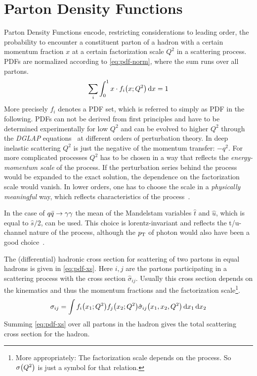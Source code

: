 \section{Parton Density Functions}%
\label{sec:pdf_basics}

Parton Density Functions encode, restricting considerations to leading
order, the probability to encounter a constituent parton of a hadron
with a certain momentum fraction \(x\) at a certain factorization
scale \(Q^2\) in a scattering process. PDFs are normalized according
to \cref{eq:pdf-norm}, where the sum runs over all partons.
%
\begin{equation}
  \label{eq:pdf-norm}
  \sum_i\int_0^1x\cdot f_i\qty(x;Q^2) \dd{x} = 1
\end{equation}
%
More precisely \({f_i}\) denotes a PDF set, which is referred to
simply as PDF in the following.  PDFs can not be derived from first
principles and have to be determined experimentally for low \(Q^2\)
and can be evolved to higher \(Q^2\) through the \emph{DGLAP}
equations~\cite{altarelli:1977af} at different orders of perturbation
theory.  In deep inelastic scattering \(Q^2\) is just the negative of
the momentum transfer: \(-q^2\). For more complicated processes
\(Q^2\) has to be chosen in a way that reflects the
\emph{energy-momentum scale} of the process. If the perturbation
series behind the process would be expanded to the exact solution, the
dependence on the factorization scale would vanish. In lower orders,
one has to choose the scale in a \emph{physically meaningful} way,
which reflects characteristics of the process~\cite{altarelli:1977af}.

In the case of \(q\bar{q}\rightarrow\gamma\gamma\) the mean of the Mandelstam variables
\(\hat{t}\) and \(\hat{u}\), which is equal to \(\hat{s}/2\), can be
used. This choice is lorentz-invariant and reflects the t/u-channel
nature of the process, although the \(p_\mathrm{T}\) of photon would also have
been a good choice~\cite[18]{buckley:2011ge}.

The (differential) hadronic cross section for scattering of two
partons in equal hadrons is given in \cref{eq:pdf-xs}. Here \(i,j\)
are the partons participating in a scattering process with the cross
section \(\hat{\sigma}_{ij}\). Usually this cross section depends on
the kinematics and thus the momentum fractions and the factorization
scale\footnote{More appropriately: The factorization scale depends on
  the process. So \(\sigma\qty(Q^2)\) is just a symbol for that
  relation.}.
%
\begin{equation}
  \label{eq:pdf-xs}
  \sigma_{ij} = \int f_i\qty(x_1;Q^2) f_j\qty(x_2;Q^2) \hat{\sigma}_{ij}\qty(x_1,
  x_2, Q^2)\dd{x_1}\dd{x_2}
\end{equation}
%
Summing \cref{eq:pdf-xs} over all partons in the hadron gives
the total scattering cross section for the hadron.


